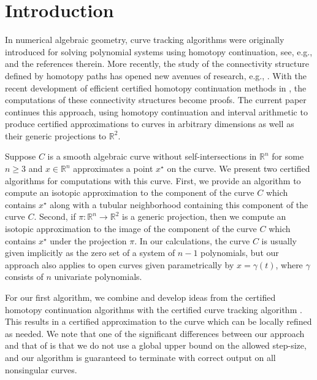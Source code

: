 
\section{Introduction}
In numerical algebraic geometry, curve tracking algorithms were originally introduced for solving polynomial systems using homotopy continuation, see, e.g., \cite{Sommese:2005,Bertini:2013} and the references therein.  More recently, the study of the connectivity structure defined by homotopy paths has opened new avenues of research, e.g., \cite{Sommese:2001,GaloisDuff:2022}.  With the recent development of efficient certified homotopy continuation methods in \cite{xu2018approach,guillemot2024validated,duff2024certified}, the computations of these connectivity structures become proofs.  The current paper continues this approach, using homotopy continuation and interval arithmetic to produce certified approximations to curves in arbitrary dimensions as well as their generic projections to $\mathbb{R}^2$.

Suppose $C$ is a smooth algebraic curve without self-intersections in $\mathbb{R}^n$ for some $n\geq 3$ and $x\in\mathbb{R}^n$ approximates a point $x^\star$ on the curve.  We present two certified algorithms for computations with this curve.  First, we provide an algorithm to compute an isotopic approximation to the component of the curve $C$ which contains $x^\star$ along with a tubular neighborhood containing this component of the curve $C$.  Second, if $\pi:\mathbb{R}^n\rightarrow\mathbb{R}^2$ is a generic projection, then we compute an isotopic approximation to the image of the component of the curve $C$ which contains $x^\star$ under the projection $\pi$.  In our calculations, the curve $C$ is usually given implicitly as the zero set of a system of $n-1$ polynomials, but our approach also applies to open curves given parametrically by $x=\gamma(t)$, where $\gamma$ consists of $n$ univariate polynomials.

For our first algorithm, we combine and develop ideas from the certified homotopy continuation algorithms \cite{guillemot2024validated,duff2024certified} with the certified curve tracking algorithm \cite{martin2013certified}.  This results in a certified approximation to the curve which can be locally refined as needed.  We note that one of the significant differences between our approach and that of \cite{martin2013certified} is that we do not use a global upper bound on the allowed step-size, and our algorithm is guaranteed to terminate with correct output on all nonsingular curves.

